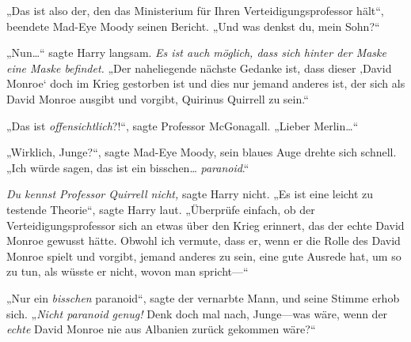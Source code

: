 „Das ist also der, den das Ministerium für Ihren Verteidigungsprofessor hält“, beendete Mad-Eye Moody seinen Bericht. „Und was denkst du, mein Sohn?“

„Nun…“ sagte Harry langsam. \emph{Es ist auch möglich, dass sich hinter der Maske eine Maske befindet.} „Der naheliegende nächste Gedanke ist, dass dieser ‚David Monroe‘ doch im Krieg gestorben ist und dies nur jemand anderes ist, der sich als David Monroe ausgibt und vorgibt, Quirinus Quirrell zu sein.“

„Das ist \emph{offensichtlich}?!“, sagte Professor McGonagall. „Lieber Merlin…“

„Wirklich, Junge?“, sagte Mad-Eye Moody, sein blaues Auge drehte sich schnell. „Ich würde sagen, das ist ein bisschen… \emph{paranoid}.“

\emph{Du kennst Professor Quirrell nicht,} sagte Harry nicht.
„Es ist eine leicht zu testende Theorie“, sagte Harry laut. „Überprüfe einfach, ob der Verteidigungsprofessor sich an etwas über den Krieg erinnert, das der echte David Monroe gewusst hätte. Obwohl ich vermute, dass er, wenn er die Rolle des David Monroe spielt und vorgibt, jemand anderes zu sein, eine gute Ausrede hat, um so zu tun, als wüsste er nicht, wovon man spricht—“

„Nur ein \emph{bisschen} paranoid“, sagte der vernarbte Mann, und seine Stimme erhob sich. „\emph{Nicht paranoid genug! } Denk doch mal nach, Junge—was wäre, wenn der \emph{echte} David Monroe nie aus Albanien zurück gekommen wäre?“

